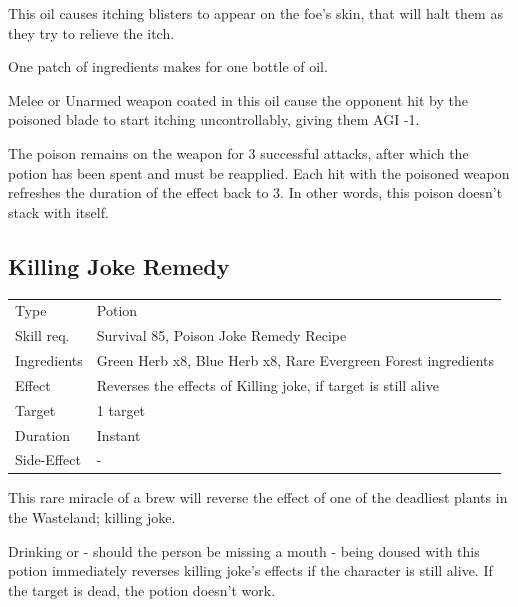 \documentclass[11pt,a4paper,twocolumn]{book}
\begin{document}
\medskip

This oil causes itching blisters to appear on the foe's skin, that will halt them as they try to relieve the itch.

One patch of ingredients makes for one bottle of oil.

Melee or Unarmed weapon coated in this oil cause the opponent hit by the poisoned blade to start itching uncontrollably, giving them AGI -1.

The poison remains on the weapon for 3 successful attacks, after which the potion has been spent and must be reapplied. Each hit with the poisoned weapon refreshes the duration of the effect back to 3. In other words, this poison doesn't stack with itself.


\subsection*{Killing Joke Remedy}
{
	\begin{tabu} to 75mm{| X[l,4] | X[l,8] |}
		\hline
		Type 			& Potion 															\\
        Skill req.	    & Survival 85, Poison Joke Remedy Recipe 							\\
        Ingredients     & Green Herb x8, Blue Herb x8, Rare Evergreen Forest ingredients	\\
        Effect     		& Reverses the effects of Killing joke, if target is still alive 	\\
        Target      	& 1 target															\\
        Duration  		& Instant	 														\\
        Side-Effect     & -																	\\ \hline
	\end{tabu}
		
}

\medskip

This rare miracle of a brew will reverse the effect of one of the deadliest plants in the Wasteland; killing joke.

Drinking or -  should the person be missing a mouth - being doused with this potion immediately reverses killing joke's effects if the character is still alive. If the target is dead, the potion doesn't work.
\end{document}
